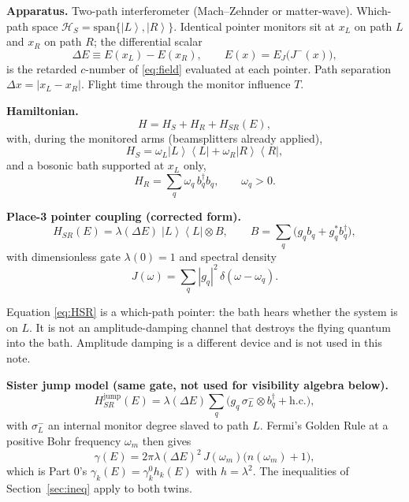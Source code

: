 \documentclass[11pt]{article}
\theoremstyle{definition}
\theoremstyle{plain}
\newcommand{\ket}[1]{\left|{#1}\right\rangle}
\newcommand{\bra}[1]{\left\langle{#1}\right|}
\begin{document}
\textbf{Apparatus.} Two-path interferometer (Mach--Zehnder or matter-wave). Which-path space
$\mathcal{H}_S = \mathrm{span}\{\ket{L}, \ket{R}\}$. Identical pointer monitors sit at $x_L$ on path $L$ and
$x_R$ on path $R$; the differential scalar
\begin{equation}
\Delta E \equiv E(x_L) - E(x_R), \qquad E(x) = E_J\!\big( J^-(x) \big),
\label{eq:diffE}
\end{equation}
is the retarded $c$-number of \eqref{eq:field} evaluated at each pointer. Path separation
$\Delta x = |x_L - x_R|$. Flight time through the monitor influence $T$.

\textbf{Hamiltonian.}
\begin{equation}
H = H_S + H_R + H_{SR}(E),
\label{eq:H}
\end{equation}
with, during the monitored arms (beamsplitters already applied),
\begin{equation}
H_S = \omega_L \ket{L}\!\bra{L} + \omega_R \ket{R}\!\bra{R},
\label{eq:HS}
\end{equation}
and a bosonic bath supported at $x_L$ only,
\begin{equation}
H_R = \sum_q \omega_q\, b^\dagger_q b_q, \qquad \omega_q > 0.
\label{eq:HR}
\end{equation}

\textbf{Place-3 pointer coupling (corrected form).}
\begin{equation}
H_{SR}(E) = \lambda(\Delta E)\; \ket{L}\!\bra{L} \otimes B, \qquad B = \sum_q \big( g_q b_q + g_q^* b^\dagger_q \big),
\label{eq:HSR}
\end{equation}
with dimensionless gate $\lambda(0) = 1$ and spectral density
\begin{equation}
J(\omega) = \sum_q |g_q|^2\, \delta(\omega - \omega_q).
\label{eq:J}
\end{equation}

Equation \eqref{eq:HSR} is a which-path pointer: the bath hears whether the system is on $L$.
It is not an amplitude-damping channel that destroys the flying quantum into the bath. Amplitude
damping is a different device and is not used in this note.

\textbf{Sister jump model (same gate, not used for visibility algebra below).}
\begin{equation}
H_{SR}^{\mathrm{jump}}(E) = \lambda(\Delta E) \sum_q \big( g_q\, \sigma_L^- \otimes b^\dagger_q + \mathrm{h.c.} \big),
\label{eq:jump}
\end{equation}
with $\sigma_L^-$ an internal monitor degree slaved to path $L$. Fermi's Golden Rule at a positive Bohr
frequency $\omega_m$ then gives
\begin{equation}
\gamma(E) = 2\pi \lambda(\Delta E)^2\, J(\omega_m)\big( n(\omega_m) + 1 \big),
\label{eq:gamma}
\end{equation}
which is Part 0's $\gamma_k(E) = \gamma_k^0 h_k(E)$ with $h = \lambda^2$. The inequalities of Section~\ref{sec:ineq}
apply to both twins.
\end{document}
